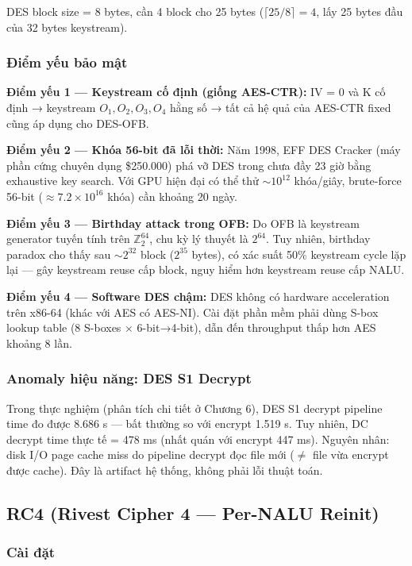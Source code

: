 DES block size = 8 bytes, cần 4 block cho 25 bytes ($\lceil 25/8 \rceil = 4$,
lấy 25 bytes đầu của 32 bytes keystream).

\subsubsection{Điểm yếu bảo mật}

\textbf{Điểm yếu 1 --- Keystream cố định (giống AES-CTR):}
IV = 0 và K cố định → keystream $O_1, O_2, O_3, O_4$ hằng số → tất cả hệ quả
của AES-CTR fixed cũng áp dụng cho DES-OFB.

\textbf{Điểm yếu 2 --- Khóa 56-bit đã lỗi thời:}
Năm 1998, EFF DES Cracker (máy phần cứng chuyên dụng \$250.000) phá vỡ DES
trong chưa đầy 23 giờ bằng exhaustive key search. Với GPU hiện đại có thể
thử $\sim10^{12}$ khóa/giây, brute-force 56-bit ($\approx 7.2 \times 10^{16}$
khóa) cần khoảng 20 ngày.

\textbf{Điểm yếu 3 --- Birthday attack trong OFB:}
Do OFB là keystream generator tuyến tính trên $\mathbb{Z}_2^{64}$, chu kỳ lý thuyết
là $2^{64}$. Tuy nhiên, birthday paradox cho thấy sau $\sim 2^{32}$ block ($2^{35}$ bytes),
có xác suất 50\% keystream cycle lặp lại --- gây keystream reuse cấp block,
nguy hiểm hơn keystream reuse cấp NALU.

\textbf{Điểm yếu 4 --- Software DES chậm:}
DES không có hardware acceleration trên x86-64 (khác với AES có AES-NI).
Cài đặt phần mềm phải dùng S-box lookup table (8 S-boxes $\times$ 6-bit→4-bit),
dẫn đến throughput thấp hơn AES khoảng 8 lần.

\subsubsection{Anomaly hiệu năng: DES S1 Decrypt}

Trong thực nghiệm (phân tích chi tiết ở Chương 6), DES S1 decrypt pipeline time
đo được 8.686 s --- bất thường so với encrypt 1.519 s. Tuy nhiên, DC decrypt time
thực tế = 478 ms (nhất quán với encrypt 447 ms). Nguyên nhân: disk I/O page cache
miss do pipeline decrypt đọc file mới ($\neq$ file vừa encrypt được cache). Đây là
artifact hệ thống, không phải lỗi thuật toán.

\subsection{RC4 (Rivest Cipher 4 --- Per-NALU Reinit)}

\subsubsection{Cài đặt}

